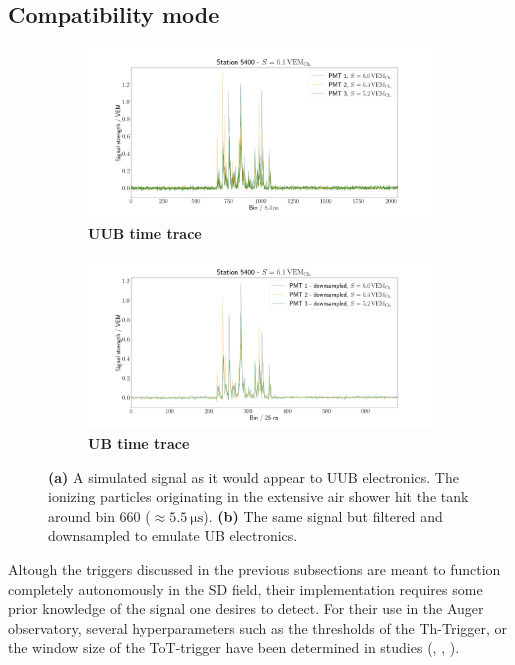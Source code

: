 \subsection{Compatibility mode}
\label{ssec:compatibility-mode}

\begin{figure}
	\begin{subfigure}[b]{0.5\textwidth}
		\centering
		\includegraphics[width=\textwidth]{./plots/time_trace_UUB.png}
		\caption{\textbf{UUB time trace}}
		\label{fig:uub-time-trace}
	\end{subfigure}
	\hfill
	\begin{subfigure}[b]{0.5\textwidth}
		\centering
		\includegraphics[width=\textwidth]{./plots/time_trace_UB.png}
		\caption{\textbf{UB time trace}}
		\label{fig:ub-time-trace}
	\end{subfigure}
	\caption{\textbf{(a)} A simulated signal as it would appear to UUB electronics. The ionizing particles originating in the extensive air shower hit the tank 
	around bin 660 ($\approx\SI{5.5}{\micro\second}$). \textbf{(b)} The same signal but filtered and downsampled to emulate UB electronics.}
	\label{fig:uub-ub-comparison}
\end{figure}

Altough the triggers discussed in the previous subsections are meant to function completely autonomously in the SD field, their implementation requires some prior 
knowledge of the signal one desires to detect. For their use in the Auger observatory, several hyperparameters such as the thresholds of the Th-Trigger, or the 
window size of the ToT-trigger have been determined in studies (\cite{bertou2006calibration}, \cite{triggerSettings}, \cite{ToTtriggerSetting}). 

